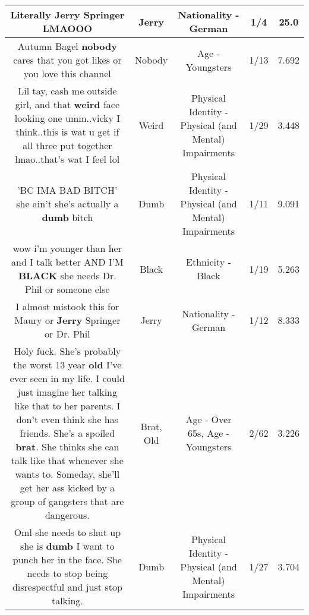 \documentclass[11pt]{article}
\newlength\mylength
\begin{document}
\begin{center}
\begin{longtable}{|C{.65\mylength}|C{.30\mylength}|C{.12\mylength}|C{.12\mylength}|C{.12\mylength}|}
  \small Literally \textbf{Jerry} Springer LMAOOO\normalsize   & Jerry & Nationality - German & 1/4 & 25.0 \\  \hline
  \small Autumn Bagel \textbf{nobody} cares that you got likes or you love this channel\normalsize   & Nobody & Age - Youngsters & 1/13 & 7.692 \\  \hline
  \small Lil tay, cash me outside girl, and that \textbf{weird} face looking one umm..vicky I think..this is wat u get if all three put together lmao..that's wat I feel lol\normalsize   & Weird & Physical Identity - Physical (and Mental) Impairments & 1/29 & 3.448 \\  \hline
  \small 'BC IMA BAD BITCH' she ain't she's actually a \textbf{dumb} bitch\normalsize   & Dumb & Physical Identity - Physical (and Mental) Impairments & 1/11 & 9.091 \\  \hline
  \small wow i'm younger than her and I talk better AND I'M \textbf{BLACK} she needs Dr. Phil or someone else\normalsize   & Black & Ethnicity - Black & 1/19 & 5.263 \\  \hline
  \small I almost mistook this for Maury or \textbf{Jerry} Springer or Dr. Phil\normalsize   & Jerry & Nationality - German & 1/12 & 8.333 \\  \hline
  \small Holy fuck. She's probably the worst 13 year \textbf{old} I've ever seen in my life. I could just imagine her talking like that to her parents. I don't even think she has friends. She's a spoiled \textbf{brat}. She thinks she can talk like that whenever she wants to. Someday, she'll get her ass kicked by a group of gangsters that are dangerous.\normalsize   & Brat, Old & Age - Over 65s, Age - Youngsters & 2/62 & 3.226 \\  \hline
  \small Oml she needs to shut up she is \textbf{dumb} I want to punch her in the face. She needs to stop being disrespectful and just stop talking.\normalsize   & Dumb & Physical Identity - Physical (and Mental) Impairments & 1/27 & 3.704 \\  \hline

\end{longtable}
\end{center}
\end{document}
